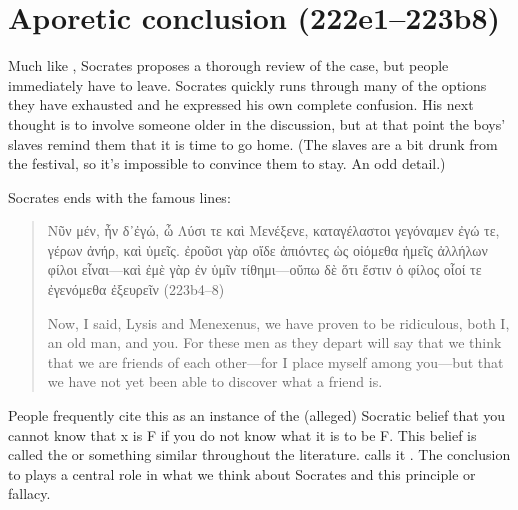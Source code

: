 \documentclass[11pt]{article}
\begin{document}

\section{Aporetic conclusion (222e1--223b8)}

Much like , Socrates proposes a thorough review of the case, but people immediately have to leave.  Socrates quickly runs through many of the options they have exhausted and he expressed his own complete confusion.  His next thought is to involve someone older in the discussion, but at that point the boys' slaves remind them that it is time to go home.  (The slaves are a bit drunk from the festival, so it's impossible to convince them to stay.  An odd detail.)

Socrates ends with the famous lines:

\begin{quote}
    {\g Νῦν μέν, ἦν δ᾽ἐγώ, ὦ Λύσι τε καὶ Μενέξενε, καταγέλαστοι γεγόναμεν ἐγώ τε, γέρων ἀνήρ, καὶ ὑμεῖς.  ἐροῦσι γὰρ οἵδε ἀπιόντες ὡς οἰόμεθα ἡμεῖς ἀλλήλων φίλοι εἶναι---καὶ ἐμὲ γὰρ ἐν ὑμῖν τίθημι---οὔπω δὲ ὅτι ἔστιν ὁ φίλος οἷοί τε ἐγενόμεθα ἐξευρεῖν} (223b4--8)

    Now, I said, Lysis and Menexenus, we have proven to be ridiculous, both I, an old man, and you.  For these men as they depart will say that we think that we are friends of each other---for I place myself among you---but that we have not yet been able to discover what a friend is.
\end{quote}

People frequently cite this as an instance of the (alleged) Socratic belief that you cannot know that x is F if you do not know what it is to be F.  This belief is called the  or something similar throughout the literature.  \citet{geach1966} calls it .  The conclusion to  plays a central role in what we think about Socrates and this principle or fallacy.



\newpage


\end{document}
